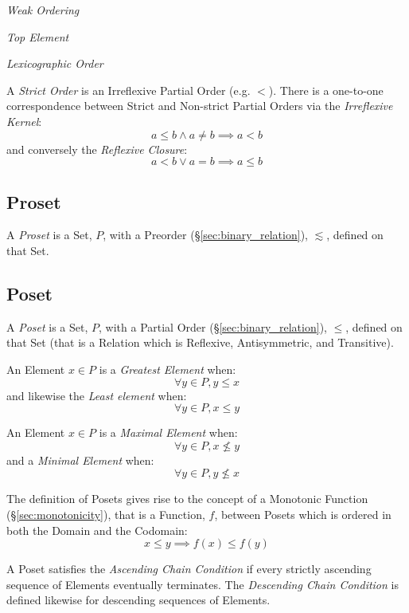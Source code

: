 \emph{Weak Ordering}

\emph{Top Element}

\emph{Lexicographic Order}

A \emph{Strict Order} is an Irreflexive Partial Order (e.g. $<$).
There is a one-to-one correspondence between Strict and Non-strict
Partial Orders via the \emph{Irreflexive Kernel}:
\[
    a \leq b \wedge a \neq b \implies a < b
\]
and conversely the \emph{Reflexive Closure}:
\[
    a < b \vee a = b \implies a \leq b
\]



\subsection{Proset}\label{sec:proset}

A \emph{Proset} is a Set, $P$, with a Preorder
(\S\ref{sec:binary_relation}), $\lesssim$, defined on that Set.



\subsection{Poset}\label{sec:poset}

A \emph{Poset} is a Set, $P$, with a Partial Order
(\S\ref{sec:binary_relation}), $\leq$, defined on that Set (that is
a Relation which is Reflexive, Antisymmetric, and Transitive).

An Element $x \in P$ is a \emph{Greatest Element} when:
\[
    \forall y \in P, y \leq x
\]
and likewise the \emph{Least element} when:
\[
    \forall y \in P, x \leq y
\]

An Element $x \in P$ is a \emph{Maximal Element} when:
\[
    \forall y \in P, x \nleq y
\]
and a \emph{Minimal Element} when:
\[
    \forall y \in P, y \nleq x
\]

The definition of Posets gives rise to the concept of a Monotonic
Function (\S\ref{sec:monotonicity}), that is a Function, $f$,
between Posets which is ordered in both the Domain and the Codomain:
\[
    x \leq y \implies f(x) \leq f(y)
\]

A Poset satisfies the \emph{Ascending Chain Condition} if every
strictly ascending sequence of Elements eventually terminates. The
\emph{Descending Chain Condition} is defined likewise for descending
sequences of Elements.



